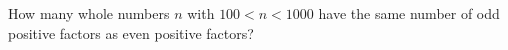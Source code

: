 How many whole numbers $n$ with $100<n<1000$ have the same number of odd positive factors as even positive factors?
